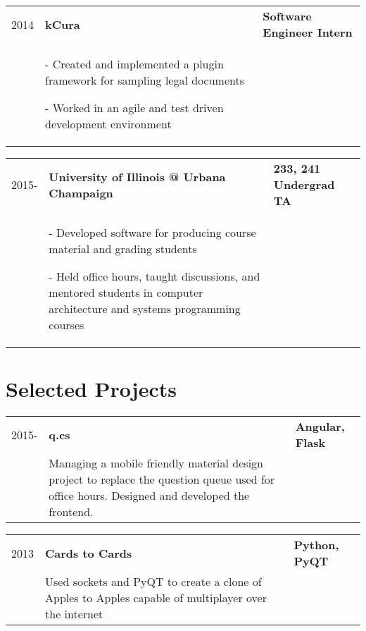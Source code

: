 \documentclass[letterpaper,10pt]{article}
\begin{document}
\begin{minipage}[t][0em][t]{0.8\textwidth}
\begin{tabular}{p{} p{} p{}}
  {2014} & \textbf{kCura} & \textbf{\small Software Engineer Intern}\\
  & {- Created and implemented a plugin framework for sampling legal documents

- Worked in an agile and test driven development environment} & \\
\end{tabular}

\begin{tabular}{p{} p{} p{}}
  
  {2015-} & \textbf{University of Illinois @ Urbana Champaign} & \textbf{\small 233, 241 Undergrad TA}\\
  & {- Developed software for producing course material and grading students

- Held office hours, taught discussions, and mentored students in computer architecture and systems programming courses} & \\
\end{tabular}
  



\section*{\huge Selected Projects}


\begin{tabular}{p{} p{} p{}}
  
  {2015-} & \textbf{q.cs} & \textbf{\small Angular, Flask}\\
  & {Managing a mobile friendly material design project to replace the question queue used for office hours. Designed and developed the frontend.} & \\
\end{tabular}

  
  
\begin{tabular}{p{} p{} p{}}
  
  {2013} & \textbf{Cards to Cards} & \textbf{\small Python, PyQT}\\
  & {Used sockets and PyQT to create a clone of Apples to Apples capable of multiplayer over the internet} & \\
\end{tabular}


\end{minipage}
\end{document}
